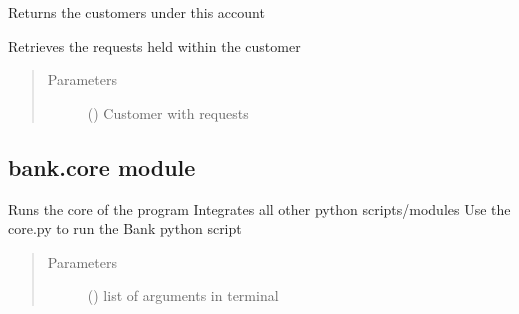 \documentclass[letterpaper,10pt,english]{sphinxmanual}
\begin{document}
\begin{fulllineitems}
\begin{fulllineitems}
\end{fulllineitems}


\begin{fulllineitems}
\label{\detokenize{bank:bank.bankTeller.BankTeller.viewCustomers}}
Returns the customers under this account

\end{fulllineitems}


\begin{fulllineitems}
\label{\detokenize{bank:bank.bankTeller.BankTeller.viewRequests}}
Retrieves the requests held within the customer
\begin{quote}\begin{description}
\item[{Parameters}] \leavevmode
{} ({\hyperref[\detokenize{bank:bank.customer.Customer}]{}}) \textendash{} Customer with requests

\end{description}\end{quote}

\end{fulllineitems}


\end{fulllineitems}



\subsection{bank.core module}
\label{\detokenize{bank:bank-core-module}}\label{\detokenize{bank:module-bank.core}}

\begin{fulllineitems}
\label{\detokenize{bank:bank.core.main}}
Runs the core of the program
Integrates all other python scripts/modules
Use the core.py to run the Bank python script
\begin{quote}\begin{description}
\item[{Parameters}] \leavevmode
{} () \textendash{} list of arguments in terminal

\end{description}\end{quote}

\end{fulllineitems}
\end{document}
